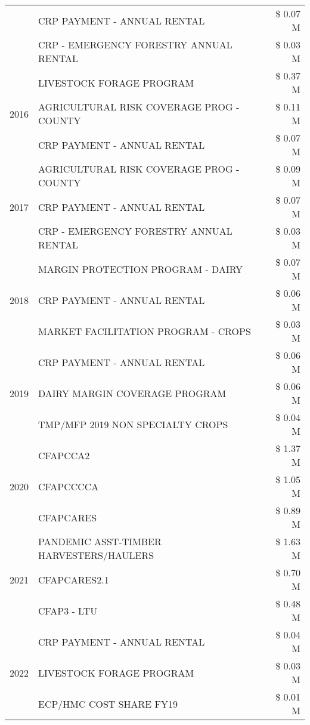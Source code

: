 \begin{tabular}{llr}
 & CRP PAYMENT - ANNUAL RENTAL & \$ 0.07 M \\
 & CRP - EMERGENCY FORESTRY ANNUAL RENTAL & \$ 0.03 M \\
\cline{1-3}
\multirow[t]{3}{*}{2016} & LIVESTOCK FORAGE PROGRAM & \$ 0.37 M \\
 & AGRICULTURAL RISK COVERAGE PROG - COUNTY & \$ 0.11 M \\
 & CRP PAYMENT - ANNUAL RENTAL & \$ 0.07 M \\
\cline{1-3}
\multirow[t]{3}{*}{2017} & AGRICULTURAL RISK COVERAGE PROG - COUNTY & \$ 0.09 M \\
 & CRP PAYMENT - ANNUAL RENTAL & \$ 0.07 M \\
 & CRP - EMERGENCY FORESTRY ANNUAL RENTAL & \$ 0.03 M \\
\cline{1-3}
\multirow[t]{3}{*}{2018} & MARGIN PROTECTION PROGRAM - DAIRY & \$ 0.07 M \\
 & CRP PAYMENT - ANNUAL RENTAL & \$ 0.06 M \\
 & MARKET FACILITATION PROGRAM - CROPS & \$ 0.03 M \\
\cline{1-3}
\multirow[t]{3}{*}{2019} & CRP PAYMENT - ANNUAL RENTAL & \$ 0.06 M \\
 & DAIRY MARGIN COVERAGE PROGRAM & \$ 0.06 M \\
 & TMP/MFP 2019 NON SPECIALTY CROPS & \$ 0.04 M \\
\cline{1-3}
\multirow[t]{3}{*}{2020} & CFAPCCA2 & \$ 1.37 M \\
 & CFAPCCCCA & \$ 1.05 M \\
 & CFAPCARES & \$ 0.89 M \\
\cline{1-3}
\multirow[t]{3}{*}{2021} & PANDEMIC ASST-TIMBER HARVESTERS/HAULERS & \$ 1.63 M \\
 & CFAPCARES2.1 & \$ 0.70 M \\
 & CFAP3 - LTU & \$ 0.48 M \\
\cline{1-3}
\multirow[t]{3}{*}{2022} & CRP PAYMENT - ANNUAL RENTAL & \$ 0.04 M \\
 & LIVESTOCK FORAGE PROGRAM & \$ 0.03 M \\
 & ECP/HMC COST SHARE FY19 & \$ 0.01 M \\
\cline{1-3}
\bottomrule
\end{tabular}
